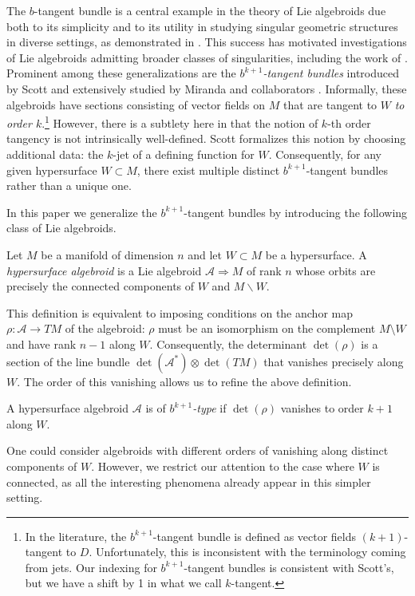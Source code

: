 \documentclass[10pt]{amsart}
\newcommand{\A}{{\mathcal{A}}}
\numberwithin{theoremalpha}{section}
\numberwithin{equation}{section}
\numberwithin{definition}{section}
\numberwithin{theorem}{section}
\numberwithin{proposition}{section}
\numberwithin{lemma}{section}
\numberwithin{example}{section}
\numberwithin{remark}{section}
\numberwithin{corollary}{section}
\numberwithin{question}{section}
\numberwithin{problem}{section}
\numberwithin{assumption}{section}
\theoremstyle{named}
\numberwithin{equation}{section}
\begin{document}
The $b$-tangent bundle is a central example in the theory of Lie algebroids due both to its simplicity and to its utility in studying singular geometric structures in diverse settings, as demonstrated in \cite{GUILLEMIN2014864, Gualtieri-Li-2012, gualtieri2018stokes, MR3245143, cavalcanti2020self, MR4876292, del2022regularisation}. This success has motivated investigations of Lie algebroids admitting broader classes of singularities, including the work of \cite{MR3805052, MR4229238, klaasse2018poisson}. Prominent among these generalizations are the \emph{$b^{k+1}$-tangent bundles} introduced by Scott \cite{MR3523250} and extensively studied by Miranda and collaborators \cite{MR4523256, MR4257086, MR4236806, MR3952555,MN25}. Informally, these algebroids have sections consisting of vector fields on $M$ that are tangent to $W$ \emph{to order $k$}.\footnote{In the literature, the $b^{k+1}$-tangent bundle is defined as vector fields $(k+1)$-tangent to $D$. Unfortunately, this is inconsistent with the terminology coming from jets. Our indexing for $b^{k+1}$-tangent bundles is consistent with Scott's, but we have a shift by 1 in what we call $k$-tangent.} However, there is a subtlety here in that the notion of $k$-th order tangency is not intrinsically well-defined. Scott formalizes this notion by choosing additional data: the $k$-jet of a defining function for $W$. Consequently, for any given hypersurface $W \subset M$, there exist multiple distinct $b^{k+1}$-tangent bundles rather than a unique one. 

In this paper we generalize the $b^{k+1}$-tangent bundles by introducing the following class of Lie algebroids. 
\begin{definition} \label{hypersurfacealgebroiddef}
Let $M$ be a manifold of dimension $n$ and let $W \subset M$ be a hypersurface. A \emph{hypersurface algebroid} is a Lie algebroid $\A \Rightarrow M$ of rank $n$ whose orbits are precisely the connected components of $W$ and $M \backslash W$. 
\end{definition}
This definition is equivalent to imposing conditions on the anchor map $\rho: \A \to TM$ of the algebroid: $\rho$ must be an isomorphism on the complement $M \setminus W$ and have rank $n - 1$ along $W$. Consequently, the determinant $\det(\rho)$ is a section of the line bundle $\det(\A^*) \otimes \det(TM)$ that vanishes precisely along $W$. The order of this vanishing allows us to refine the above definition. 

\begin{definition}\label{hypersfalgbktype}
A hypersurface algebroid $\A$ is of \emph{$b^{k+1}$-type} if $\det(\rho)$ vanishes to order $k+1$ along $W$. 
\end{definition}
\begin{remark}
One could consider algebroids with different orders of vanishing along distinct components of $W$. However, we restrict our attention to the case where $W$ is connected, as all the interesting phenomena already appear in this simpler setting.
\end{remark}
\end{document}

